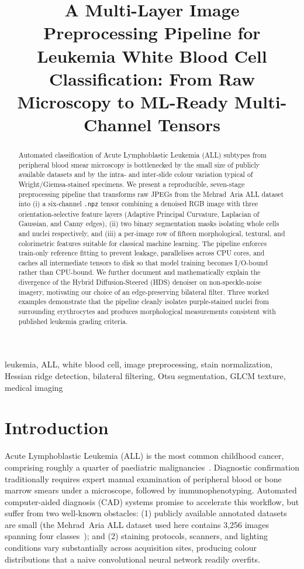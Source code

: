 \documentclass[conference,10pt]{IEEEtran}
\title{A Multi-Layer Image Preprocessing Pipeline for Leukemia
White Blood Cell Classification: From Raw Microscopy to
ML-Ready Multi-Channel Tensors}
\author{
  \IEEEauthorblockN{Manvita Preprocessing Pipeline --- Technical Report}
}
\begin{document}
\maketitle

\begin{abstract}
Automated classification of Acute Lymphoblastic Leukemia (ALL) subtypes from peripheral blood smear microscopy is bottlenecked by the small size of publicly available datasets and by the intra- and inter-slide colour variation typical of Wright/Giemsa-stained specimens. We present a reproducible, seven-stage preprocessing pipeline that transforms raw JPEGs from the Mehrad~Aria ALL dataset into (i) a six-channel \texttt{.npz} tensor combining a denoised RGB image with three orientation-selective feature layers (Adaptive Principal Curvature, Laplacian of Gaussian, and Canny edges), (ii) two binary segmentation masks isolating whole cells and nuclei respectively, and (iii) a per-image row of fifteen morphological, textural, and colorimetric features suitable for classical machine learning. The pipeline enforces train-only reference fitting to prevent leakage, parallelises across CPU cores, and caches all intermediate tensors to disk so that model training becomes I/O-bound rather than CPU-bound. We further document and mathematically explain the divergence of the Hybrid Diffusion-Steered (HDS) denoiser on non-speckle-noise imagery, motivating our choice of an edge-preserving bilateral filter. Three worked examples demonstrate that the pipeline cleanly isolates purple-stained nuclei from surrounding erythrocytes and produces morphological measurements consistent with published leukemia grading criteria.
\end{abstract}

\begin{IEEEkeywords}
leukemia, ALL, white blood cell, image preprocessing, stain normalization, Hessian ridge detection, bilateral filtering, Otsu segmentation, GLCM texture, medical imaging
\end{IEEEkeywords}

\section{Introduction}
\label{sec:intro}

Acute Lymphoblastic Leukemia (ALL) is the most common childhood cancer, comprising roughly a quarter of paediatric malignancies~\cite{ward2014childhood}. Diagnostic confirmation traditionally requires expert manual examination of peripheral blood or bone marrow smears under a microscope, followed by immunophenotyping. Automated computer-aided diagnosis (CAD) systems promise to accelerate this workflow, but suffer from two well-known obstacles: (1) publicly available annotated datasets are small (the Mehrad~Aria ALL dataset used here contains 3,256 images spanning four classes~\cite{aria2021all}); and (2) staining protocols, scanners, and lighting conditions vary substantially across acquisition sites, producing colour distributions that a naive convolutional neural network readily overfits.
\end{document}
